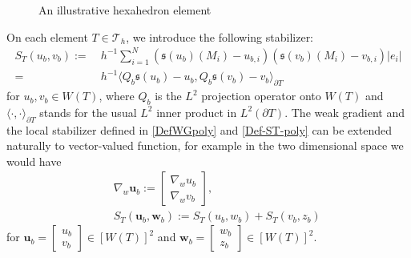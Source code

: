 \documentclass[final,leqno]{siamltex704}
\def\S{{\mathfrak s}}
\def\T{{\mathcal T}}
\def\pT{{\partial T}}
\begin{document}
\begin{figure}[!h]
\begin{center}
\end{center}
\caption{An illustrative hexahedron element}
\label{fig.hexahedron}
\end{figure}

On each element $T\in \T_h$, we introduce the following stabilizer:
\begin{equation}\label{Def-ST-poly}
\begin{split}
S_T(u_b,v_b):=&\ h^{-1}\sum_{i=1}^N (\S(u_b)(M_i)-u_{b,i})(\S(v_b)(M_i)-v_{b,i})|e_i|\\
            = & \ h^{-1}\langle Q_b \S(u_b)-u_{b},Q_b \S(v_b)- v_{b}\rangle_{\partial T}
            \end{split}
\end{equation}
for $u_b, v_b \in W(T)$, where $Q_b$ is the $L^2$ projection operator onto $W(T)$ and $\langle\cdot,\cdot\rangle_\pT$ stands for the usual $L^2$ inner product in $L^2(\pT)$. The weak gradient and the local stabilizer defined in \eqref{DefWGpoly} and \eqref{Def-ST-poly} can be extended naturally to vector-valued function, for example in the two dimensional space we would have
\begin{eqnarray}
&&\nabla_w \bm{u}_b :=\begin{bmatrix} \nabla_w u_b\\ \nabla_w v_b \end{bmatrix},\\
&& S_T(\bm{u}_b,\bm{w}_b) := S_T(u_b,w_b) + S_T(v_b,z_b)
\end{eqnarray}
for $\bm{u}_b = \begin{bmatrix} u_b\\ v_b \end{bmatrix} \in [W(T)]^2$ and $\bm{w}_b = \begin{bmatrix} w_b\\ z_b \end{bmatrix} \in [W(T)]^2$.
\end{document}
